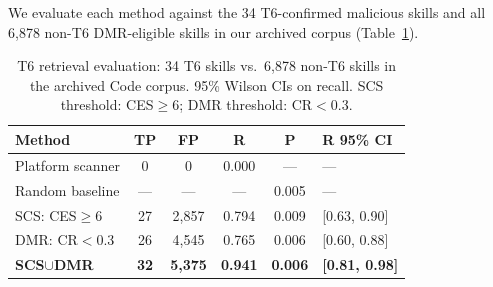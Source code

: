 We evaluate each method against the 34 T6-confirmed malicious skills
and all 6,878 non-T6 DMR-eligible skills in our archived corpus
(Table~\ref{tab:e2e}).

\begin{table}[h]
\centering
\caption{T6 retrieval evaluation: 34 T6 skills vs.\
  6,878 non-T6 skills in the archived Code corpus.
  95\% Wilson CIs on recall.
  SCS threshold: CES$\geq$6; DMR threshold: CR$<$0.3.}
\label{tab:e2e}
\small
\begin{tabular}{@{}lccccl@{}}
\toprule
\textbf{Method} & \textbf{TP} & \textbf{FP} & \textbf{R}
  & \textbf{P} & \textbf{R 95\% CI} \\
\midrule
Platform scanner
  & 0   & 0     & 0.000 & ---   & --- \\
Random baseline
  & ---  & ---   & ---   & 0.005 & ---  \\
SCS: CES$\geq$6
  & 27  & 2,857 & 0.794 & 0.009 & [0.63, 0.90] \\
DMR: CR$<$0.3
  & 26  & 4,545 & 0.765 & 0.006 & [0.60, 0.88] \\
\textbf{SCS$\cup$DMR}
  & \textbf{32} & \textbf{5,375} & \textbf{0.941}
  & \textbf{0.006} & \textbf{[0.81, 0.98]} \\
\bottomrule
\end{tabular}
\end{table}

